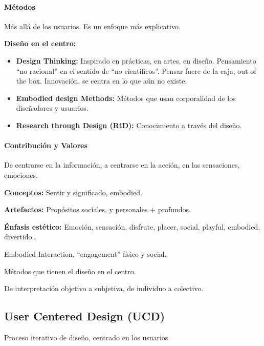 \hypertarget{muxe9todos-2}{%
\paragraph{Métodos}\label{muxe9todos-2}}

Más allá de los usuarios. Es un enfoque más explicativo.

\textbf{Diseño en el centro:}

\begin{itemize}
\item
  \textbf{Design Thinking:} Inspirado en prácticas, en artes, en diseño.
  Pensamiento ``no racional'' en el sentido de ``no científicos''.
  Pensar fuere de la caja, out of the box. Innovación, se centra en lo
  que aún no existe.
\item
  \textbf{Embodied design Methods:} Métodos que usan corporalidad de los
  diseñadores y usuarios.
\item
  \textbf{Research through Design (RtD):} Conocimiento a través del
  diseño.
\end{itemize}

\hypertarget{contribuciuxf3n-y-valores-2}{%
\paragraph{Contribución y Valores}\label{contribuciuxf3n-y-valores-2}}

De centrarse en la información, a centrarse en la acción, en las
sensaciones, emociones.

\textbf{Conceptos:} Sentir y significado, embodied.

\textbf{Artefactos:} Propósitos sociales, y personales + profundos.

\textbf{Énfasis estético:} Emoción, sensación, disfrute, placer, social,
playful, embodied, divertido\ldots{}

Embodied Interaction, ``engagement'' físico y social.

Métodos que tienen el diseño en el centro.

De interpretación objetivo a subjetiva, de individuo a colectivo.

\hypertarget{user-centered-design-ucd}{%
\subsection{User Centered Design (UCD)}\label{user-centered-design-ucd}}

Proceso iterativo de diseño, centrado en los usuarios.


